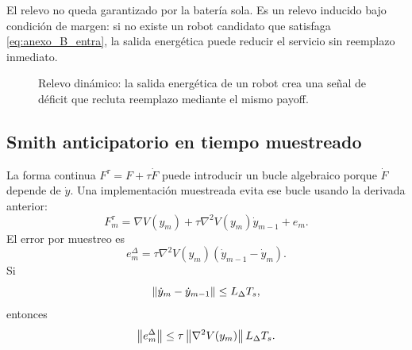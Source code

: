 El relevo no queda garantizado por la batería sola. Es un relevo inducido bajo condición
de margen: si no existe un robot candidato que satisfaga \eqref{eq:anexo_B_entra}, la
salida energética puede reducir el servicio sin reemplazo inmediato.

\begin{figure}[H]
\centering
{}
\caption{Relevo dinámico: la salida energética de un robot crea una señal de déficit
que recluta reemplazo mediante el mismo payoff.}
\label{fig:anexo_handover}
\end{figure}

\subsection{Smith anticipatorio en tiempo muestreado}
\label{subsec:smith-sampled-data}

La forma continua $F^\tau=F+\tau\dot F$ puede introducir un bucle algebraico porque
$\dot F$ depende de $\dot y$. Una implementación muestreada evita ese bucle usando la
derivada anterior:
\begin{equation}
  F_m^\tau
  =
  \nabla V(y_m)
  +
  \tau\nabla^2V(y_m)\dot y_{m-1}
  +
  e_m.
  \label{eq:anexo_smith_sampled}
\end{equation}
El error por muestreo es
\begin{equation}
  e_m^\Delta
  =
  \tau\nabla^2V(y_m)(\dot y_{m-1}-\dot y_m).
  \label{eq:anexo_error_sampled}
\end{equation}
Si
\[
  \left\|\dot y_m-\dot y_{m-1}\right\|\le L_\Delta T_s,
\]
entonces
\begin{equation}
  \left\|e_m^\Delta\right\|
  \le
  \tau\left\|\nabla^2V(y_m)\right\|L_\Delta T_s.
  \label{eq:anexo_cota_error_sampled}
\end{equation}

